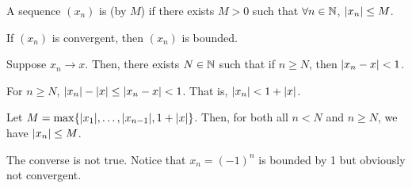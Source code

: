 \documentclass[class=pmath370,tikz,notes]{agony}
\begin{document}
\begin{defn*}
  A sequence $(x_n)$ is  (by $M$)
  if there exists $M > 0$ such that $\forall n\in\mathbb{N}$, $\abs{x_n} \leq M$.
\end{defn*}

\begin{prop}
  If $(x_n)$ is convergent, then $(x_n)$ is bounded.
\end{prop}
\begin{prf}
  Suppose $x_n \to x$.
  Then, there exists $N \in \mathbb{N}$ such that if $n \geq N$,
  then $\abs{x_n - x} < 1$.

  For $n \geq N$, $\abs{x_n} - \abs{x} \leq \abs{x_n-x} < 1$.
  That is, $\abs{x_n} < 1 + \abs{x}$.

  Let $M = \max\{\abs{x_1},\dotsc,\abs{x_{n-1}},1+\abs{x}\}$.
  Then, for both all $n < N$ and $n \geq N$, we have $\abs{x_n} \leq M$.
\end{prf}

\begin{remark}
  The converse is not true. Notice that $x_n = (-1)^n$ is bounded by 1
  but obviously not convergent.
\end{remark}
\end{document}
